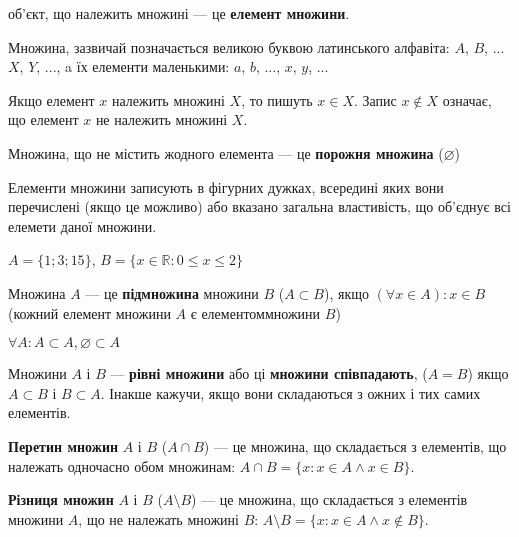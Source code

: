 \begin{definition}
    об'єкт, що належить множині --- це \textbf{елемент множини}.
\end{definition}

Множина, зазвичай позначається великою буквою латинського алфавіта: $A$, $B$, ...
$X$, $Y$, ..., a їх елементи маленькими: $a$, $b$, ..., $x$, $y$, ...

Якщо елемент $x$ належить множині $X$, то пишуть $x \in X$. Запис $x \notin X$
означає, що елемент $x$ не належить множині $X$.

\begin{definition}
    Множина, що не містить жодного елемента --- це \textbf{порожня множина} ($\varnothing$)
\end{definition}

Елементи множини записують в фігурних дужках, всередині яких вони перечислені (якщо це можливо)
або вказано загальна властивість, що об'єднує всі елемети даної множини.

\begin{example}
    $A = \{1; 3; 15\}$, $B = \{x \in \mathbb{R}: 0 \leqslant x \leqslant 2 \}$
\end{example}

\begin{definition}
    Множина $A$ --- це \textbf{підмножина} множини $B$ ($A \subset B$), якщо
    $(\forall x \in A): x \in B$ (кожний елемент множини $A$ є елементоммножини $B$)
\end{definition}

$\forall A: A \subset A, \varnothing \subset A$

\begin{definition}
    Множини $A$ і $B$ --- \textbf{рівні множини} або ці \textbf{множини співпадають},
    ($A = B$) якщо $A \subset B$ і $B \subset A$. Інакше кажучи, якщо вони складаються
    з ожних і тих самих елементів.
\end{definition}

\begin{definition}
    \textbf{Перетин множин} $A$ і $B$ ($A \cap B$) --- це множина, що складається з
    елементів, що належать одночасно обом множинам: $A \cap B = \{x: x \in A \wedge x \in B\}$.
\end{definition}

\begin{definition}
    \textbf{Різниця множин} $A$ і $B$ ($A \setminus B$) --- це множина, що складається з
    елементів множини $A$, що не належать множині $B$:
    $A \setminus B = \{x: x \in A \wedge x \notin B\}$.
\end{definition}

